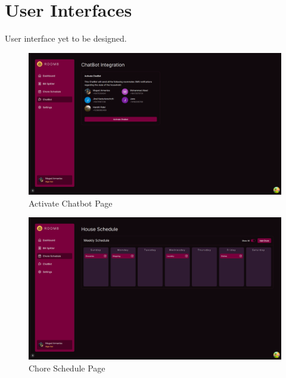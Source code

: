 \documentclass[12pt, titlepage]{article}
\begin{document}

\section{User Interfaces}
User interface yet to be designed.


\begin{figure}[H]
  \centering
  \includegraphics[width=\textwidth]{chatbot.png}
  \caption{Activate Chatbot Page}
  \label{fig:landing}
\end{figure}
\begin{figure}[H]
  \centering
  \includegraphics[width=\textwidth]{choreSchedule.png}
  \caption{Chore Schedule Page}
  \label{fig:landing}
\end{figure}
\end{document}
